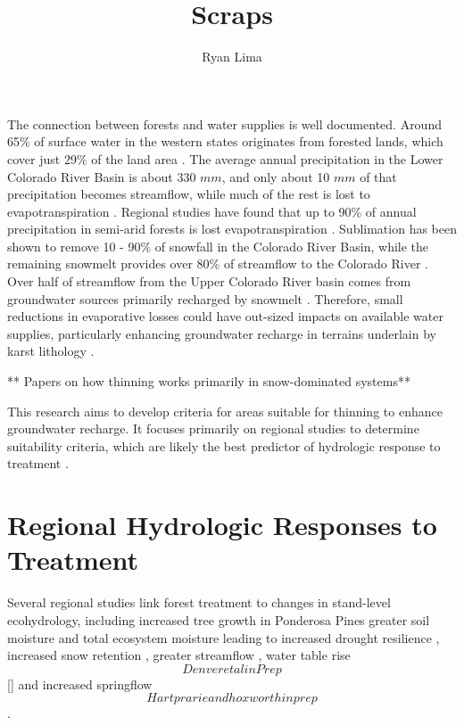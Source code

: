\documentclass[
  number]{elsarticle}
\begin{document}
\begin{frontmatter}
\title{Scraps}
\author[]{Ryan Lima%
%
}




        





\end{frontmatter}
    
The connection between forests and water supplies is well documented.
Around 65\% of surface water in the western states originates from
forested lands, which cover just 29\% of the land area
\citep{brown_source_2005}. The average annual precipitation in the Lower
Colorado River Basin is about 330 \(mm\), and only about 10 \(mm\) of
that precipitation becomes streamflow, while much of the rest is lost to
evapotranspiration \citep{zou_streamflow_2010}. Regional studies have
found that up to 90\% of annual precipitation in semi-arid forests is
lost evapotranspiration
\citep{dore_recovery_2012, ha_evapotranspiration_2015, yaseef_ecohydrology_2010, hibbert1979}.
Sublimation has been shown to remove 10 - 90\% of snowfall in the
Colorado River Basin, while the remaining snowmelt provides over 80\% of
streamflow to the Colorado River \citep{lundquist_sublimation_2024}.
Over half of streamflow from the Upper Colorado River basin comes from
groundwater sources primarily recharged by snowmelt \citep{miller2016}.
Therefore, small reductions in evaporative losses could have out-sized
impacts on available water supplies, particularly enhancing groundwater
recharge in terrains underlain by karst lithology
\citep{hibbert1979, wyatt2013}.

** Papers on how thinning works primarily in snow-dominated systems**

This research aims to develop criteria for areas suitable for thinning
to enhance groundwater recharge. It focuses primarily on regional
studies to determine suitability criteria, which are likely the best
predictor of hydrologic response to treatment
\citep{wyatt_estimating_2013}.

\section{Regional Hydrologic Responses to
Treatment}\label{regional-hydrologic-responses-to-treatment}

Several regional studies link forest treatment to changes in stand-level
ecohydrology, including increased tree growth in Ponderosa Pines greater
soil moisture and total ecosystem moisture leading to increased drought
resilience \citep{sankey_regionalscale_2021, sankey_thinning_2022},
increased snow retention \citep{broxton_subseasonal_2023, belmonte2021},
greater streamflow \citep{baker_effects_1986}, water table rise
\[Denver et al in Prep \]{[}\citep{smerdon_overview_2009}{]}\citep{schenk_impacts_2020}
and increased springflow
\citep{schenk_impacts_2020}\[Hart prarie and hoxworth in prep\].
\end{document}
